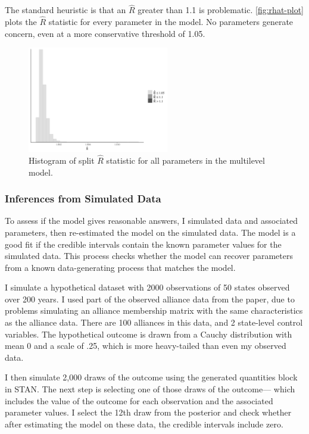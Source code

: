 \documentclass[12pt]{article}
\begin{document}
The standard heuristic is that an $\hat{R}$ greater than 1.1 is problematic. 
\autoref{fig:rhat-plot} plots the $\hat{R}$ statistic for every parameter in the model. 
No parameters generate concern, even at a more conservative threshold of 1.05. 


\begin{figure}[htbp]
	\centering
		\includegraphics[width=0.55\textwidth]{rhat-plot.pdf}
	\caption{Histogram of split $\hat{R}$ statistic for all parameters in the multilevel model.}
	\label{fig:rhat-plot}
\end{figure}


\subsubsection{Inferences from Simulated Data}


To assess if the model gives reasonable answers, I simulated data and associated parameters, then re-estimated the model on the simulated data.
The model is a good fit if the credible intervals contain the known parameter values for the simulated data. 
This process checks whether the model can recover parameters from a known data-generating process that matches the model. 


I simulate a hypothetical dataset with 2000 observations of 50 states observed over 200 years.
I used part of the observed alliance data from the paper, due to problems simulating an alliance membership matrix with the same characteristics as the alliance data. 
There are 100 alliances in this data, and 2 state-level control variables. 
The hypothetical outcome is drawn from a Cauchy distribution with mean 0 and a scale of .25, which is more heavy-tailed than even my observed data. 


I then simulate 2,000 draws of the outcome using the generated quantities block in STAN. 
The next step is selecting one of those draws of the outcome--- which includes the value of the outcome for each observation and the associated parameter values. 
I select the 12th draw from the posterior and check whether after estimating the model on these data, the credible intervals include zero. 
\end{document}
